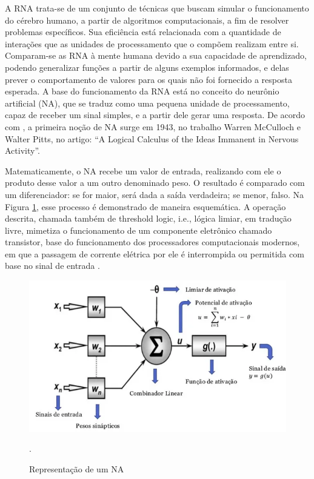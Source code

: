A RNA trata-se de um conjunto de técnicas que buscam simular o funcionamento do cérebro humano, a partir de algoritmos computacionais, a fim de resolver problemas específicos. Sua eficiência está relacionada com a quantidade de interações que as unidades de processamento que o compõem realizam entre si. Comparam-se as RNA à mente humana devido a sua capacidade de aprendizado, podendo generalizar funções a partir de alguns exemplos informados, e delas prever o comportamento de valores para os quais não foi fornecido a resposta esperada. A base do funcionamento da RNA está no conceito do neurônio artificial (NA), que se traduz como uma pequena unidade de processamento, capaz de receber um sinal simples, e a partir dele gerar uma resposta.  De acordo com  \cite{fleck2016redes}, a primeira noção de NA surge em 1943, no trabalho Warren McCulloch e Walter Pitts, no artigo: “A Logical Calculus of the Ideas Immanent in Nervous Activity”.

Matematicamente, o NA recebe um valor de entrada, realizando com ele o produto desse valor a um outro denominado peso. O resultado é comparado com um diferenciador: se for maior, será dada a saída verdadeira; se menor, falso. Na Figura \ref{fig:na}, esse processo é demonstrado de maneira esquemática. A operação descrita, chamada também de threshold logic, i.e., lógica limiar, em tradução livre, mimetiza o funcionamento de um componente eletrônico chamado transistor, base do funcionamento dos processadores computacionais modernos, em que a passagem de corrente elétrica por ele é interrompida ou permitida com base no sinal de entrada \cite {mcculloch1943logical}. 

\begin{figure}[!h]
    \centering
    \begin{minipage}{1\linewidth}
    \centering
    \captionsetup{justification=centering,margin=0.5cm,font=small}
    \includegraphics[width=1\linewidth]{img/cap2/na-completo.png}
    \caption{Representação de um NA \cite{adorno2017}}.
    \label{fig:na}
    \end{minipage}
\end{figure}

